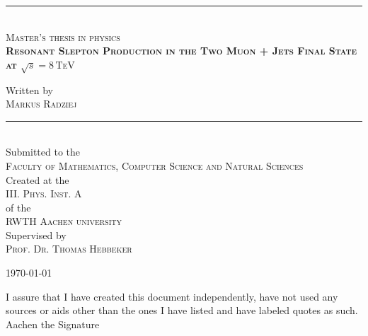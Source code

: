 \documentclass[11pt,a4paper,twoside,openright,DIV=13,BCOR=1cm]{scrbook} %
\numberwithin{equation}{chapter} %
\numberwithin{figure}{chapter} %
\numberwithin{table}{chapter} %
\begin{document}
\pagestyle{empty}

\begin{titlepage}
  \begin{center}
    \vspace{3.0cm}
    
    \rule{\linewidth}{0.5pt} \\
    \textsc{Master's thesis in physics} \\[0.4cm]
    
    \doublespacing
    \textsc{\LARGE \textbf{Resonant Slepton Production in the Two Muon + Jets Final State at $\sqrt{s} = 8\,\text{TeV}$}}\\[1.5cm]
    \singlespacing
    
    Written by\\[0.2cm]
    \textsc{Markus Radziej}\\
    
    
    \rule{\linewidth}{0.5pt} \\[3cm]
    
    
    
    Submitted to the\\
    \textsc{\large Faculty of Mathematics, Computer Science and Natural Sciences}\\[1.5cm]
    Created at the\\
    \textsc{\large III. Phys. Inst. A} \\[0.2cm]
    of the\\
    \textsc{\large RWTH Aachen university} \\[0.5cm]
    
    Supervised by\\
    \textsc{Prof. Dr. Thomas Hebbeker}
    
    \vfill
    {\large \today}
    
  \end{center}
\end{titlepage}

\clearpage{\pagestyle{empty}\cleardoublepage} %


\newpage
\noindent I assure that I have created this document independently, have not used any sources or aids other than the ones I have listed and have labeled quotes as such.\\[1.0cm]
\noindent Aachen the \hfill Signature
\end{document}

